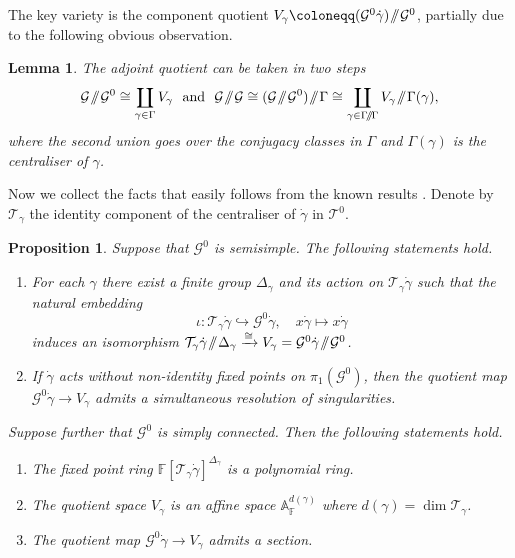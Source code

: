 \documentclass[10pt]{article}
\newtheorem{prop}{Proposition}
\newtheorem{lem}{Lemma}
\theoremstyle{definition}
\theoremstyle{remark}
\newcommand{\bA}{{\mathbb A}}
\newcommand{\bF}{{\mathbb F}}
\newcommand{\cG}{{{\mathcal G}}}
\newcommand{\cT}{{{\mathcal T}}}
\newcommand{\sslash}{\mathbin{/\mkern-6mu/}}
\newcommand{\GG}{{\cG\!\sslash\! \cG}}
\newcommand{\VG}{{V_{\gamma}}}
\begin{document}
The key variety is the component quotient $\VG \coloneqq (\cG^0 \dot{\gamma})\!\sslash\! \cG^0$, partially due to the following obvious observation.
\begin{lem} \label{lem1}
  The adjoint quotient can be taken in two steps
  \[
  \cG\!\sslash\! \cG^0  \cong \coprod_{\gamma \in \Gamma} \VG \ \mbox{ and }  \  %
  \GG \cong (\cG\!\sslash\! \cG^0)\!\sslash\! \Gamma \cong \coprod_{\gamma \in \Gamma\!\sslash\!\Gamma} \VG\!\sslash\! \Gamma (\gamma),
    \]
where the second union goes over the conjugacy classes in $\Gamma$ and $\Gamma (\gamma)$ is the centraliser of $\gamma$.
\end{lem}  
Now we collect the facts that easily follows from the known results \cite{diss,Spr}.
Denote by $\cT_\gamma$ the identity component of the centraliser of $\dot{\gamma}$ in $\cT^0$. 
\begin{prop} \label{Prop2}
  Suppose that $\cG^0$ is semisimple. The following statements hold.
  \begin{enumerate}
  \item For each $\gamma$ there exist
    a finite group $\Delta_\gamma$ and its action on $\cT_\gamma \dot{\gamma}$ such that the natural embedding
    \[ \iota: \cT_\gamma \dot{\gamma} \hookrightarrow \cG^0 \dot{\gamma}, \quad x\dot{\gamma}\mapsto x\dot{\gamma} \]
    induces an isomorphism $\cT_\gamma \dot{\gamma} \!\sslash\! \Delta_{\gamma} \xrightarrow{\cong} V_\gamma = \cG^0 \dot{\gamma} \!\sslash\! \cG^{0}$.
  \item %
    If $\dot{\gamma}$ acts without non-identity fixed points on $\pi_1 (\cG^0)$, then
    the quotient map  $\cG^0 \dot{\gamma} \rightarrow V_\gamma$ admits a simultaneous resolution of singularities. 
\setcounter{Coco}{\value{enumi}}
\end{enumerate}
  Suppose further that $\cG^0$ is simply connected. Then the following statements hold.
\begin{enumerate}
\setcounter{enumi}{\value{Coco}}
\item The fixed point ring $\bF [\cT_{\gamma} \dot{\gamma}]^{\Delta_\gamma}$ is a polynomial ring.
\item The quotient space $V_{\gamma}$ is an affine space $\bA^{d(\gamma)}_{\bF}$ where $d(\gamma)=\dim \cT_\gamma$. 
\item The quotient map  $\cG^0 \dot{\gamma} \rightarrow V_\gamma$ admits a section.
\end{enumerate}
\end{prop}  
\end{document}
